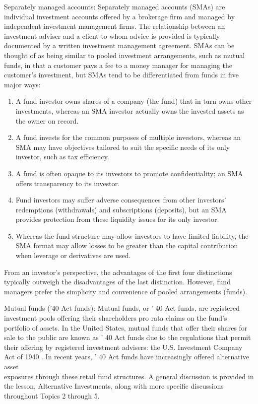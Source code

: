 \documentclass[11pt]{article}
\begin{document}
Separately managed accounts: Separately managed accounts (SMAs) are individual investment accounts offered by a brokerage firm and managed by independent investment management firms. The relationship between an investment adviser and a client to whom advice is provided is typically documented by a written investment management agreement. SMAs can be thought of as being similar to pooled investment arrangements, such as mutual funds, in that a customer pays a fee to a money manager for managing the customer's investment, but SMAs tend to be differentiated from funds in five major ways:

\begin{enumerate}
  \item A fund investor owns shares of a company (the fund) that in turn owns other investments, whereas an SMA investor actually owns the invested assets as the owner on record.

  \item A fund invests for the common purposes of multiple investors, whereas an SMA may have objectives tailored to suit the specific needs of its only investor, such as tax efficiency.

  \item A fund is often opaque to its investors to promote confidentiality; an SMA offers transparency to its investor.

  \item Fund investors may suffer adverse consequences from other investors' redemptions (withdrawals) and subscriptions (deposits), but an SMA provides protection from these liquidity issues for its only investor.

  \item Whereas the fund structure may allow investors to have limited liability, the SMA format may allow losses to be greater than the capital contribution when leverage or derivatives are used.

\end{enumerate}

From an investor's perspective, the advantages of the first four distinctions typically outweigh the disadvantages of the last distinction. However, fund managers prefer the simplicity and convenience of pooled arrangements (funds).

Mutual funds ('40 Act funds): Mutual funds, or ' 40 Act funds, are registered investment pools offering their shareholders pro rata claims on the fund's portfolio of assets. In the United States, mutual funds that offer their shares for sale to the public are known as ' 40 Act funds due to the regulations that permit their offering by registered investment advisers: the U.S. Investment Company Act of 1940 . In recent years, ' 40 Act funds have increasingly offered alternative asset\\
exposures through these retail fund structures. A general discussion is provided in the lesson, Alternative Investments, along with more specific discussions throughout Topics 2 through 5.
\end{document}

